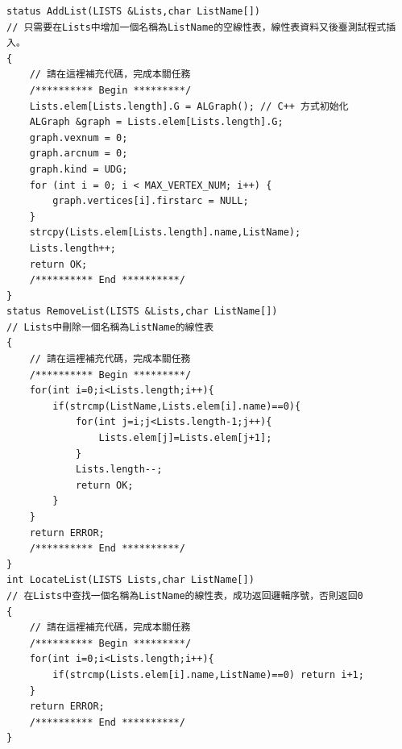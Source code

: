 \documentclass[supercite]{Experimental_Report}
\theoremstyle{definition}
\begin{document}
\begin{lstlisting}[style=commonCodeStyle, caption={目标程序}, label={lst:2-17}]
status AddList(LISTS &Lists,char ListName[])
// 只需要在Lists中增加一個名稱為ListName的空線性表，線性表資料又後臺測試程式插入。
{
	// 請在這裡補充代碼，完成本關任務
	/********** Begin *********/  
	Lists.elem[Lists.length].G = ALGraph(); // C++ 方式初始化
	ALGraph &graph = Lists.elem[Lists.length].G;
	graph.vexnum = 0;
	graph.arcnum = 0;
	graph.kind = UDG;
	for (int i = 0; i < MAX_VERTEX_NUM; i++) {
		graph.vertices[i].firstarc = NULL;
	}
	strcpy(Lists.elem[Lists.length].name,ListName);
	Lists.length++;
	return OK;
	/********** End **********/
}
status RemoveList(LISTS &Lists,char ListName[])
// Lists中刪除一個名稱為ListName的線性表
{
	// 請在這裡補充代碼，完成本關任務
	/********** Begin *********/
	for(int i=0;i<Lists.length;i++){
		if(strcmp(ListName,Lists.elem[i].name)==0){
			for(int j=i;j<Lists.length-1;j++){
				Lists.elem[j]=Lists.elem[j+1];
			}
			Lists.length--;
			return OK;
		}
	}
	return ERROR;
	/********** End **********/
}
int LocateList(LISTS Lists,char ListName[])
// 在Lists中查找一個名稱為ListName的線性表，成功返回邏輯序號，否則返回0
{
	// 請在這裡補充代碼，完成本關任務
	/********** Begin *********/
	for(int i=0;i<Lists.length;i++){
		if(strcmp(Lists.elem[i].name,ListName)==0) return i+1;
	}
	return ERROR;
	/********** End **********/
}
\end{lstlisting}
\end{document}

